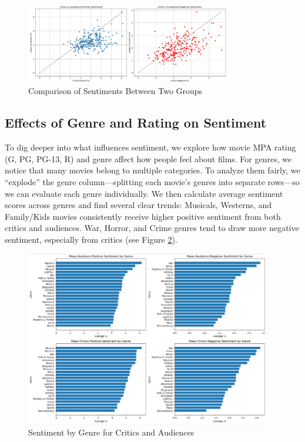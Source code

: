\documentclass{article}
\begin{document}
\begin{figure}[H]
    \centering
    \includegraphics[width=0.8\textwidth]{ReviewScatter.png}
    \caption{Comparison of Sentiments Between Two Groups}
    \label{fig:sentiment_comparison}
\end{figure}

\subsection{Effects of Genre and Rating on Sentiment}
To dig deeper into what influences sentiment, we explore how movie MPA rating (G, PG, PG-13, R) and genre affect how people feel about films. For genres, we notice that many movies belong to multiple categories. To analyze them fairly, we “explode” the genre column—splitting each movie’s genres into separate rows—so we can evaluate each genre individually. We then calculate average sentiment scores across genres and find several clear trends: Musicals, Westerns, and Family/Kids movies consistently receive higher positive sentiment from both critics and audiences. War, Horror, and Crime genres tend to draw more negative sentiment, especially from critics (see Figure \ref{fig:sentiment_genre}).

\begin{figure}[H]
    \centering
    \includegraphics[width=0.95\textwidth]{Genre.png}
    \caption{Sentiment by Genre for Critics and Audiences}
    \label{fig:sentiment_genre}
\end{figure}
\end{document}
